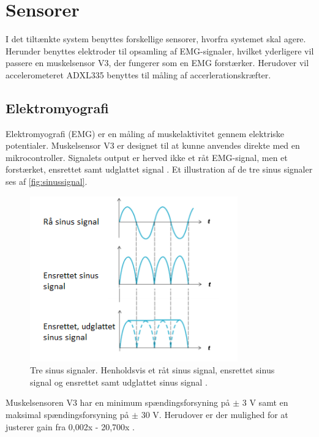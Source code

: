\section{Sensorer}
I det tiltænkte system benyttes forskellige sensorer, hvorfra systemet skal agere. Herunder benyttes elektroder til opsamling af EMG-signaler, hvilket yderligere vil passere en muskelsensor V3, der fungerer som en EMG forstærker. Herudover vil accelerometeret ADXL335 benyttes til måling af accerlerationskræfter.

\subsection{Elektromyografi}
Elektromyografi (EMG) er en måling af muskelaktivitet gennem elektriske potentialer. 
Muskelsensor V3 er designet til at kunne anvendes direkte med en mikrocontroller. Signalets output er herved ikke et råt EMG-signal, men et forstærket, ensrettet samt udglattet signal \citep{advancertech2013}. Et illustration af de tre sinus signaler ses af \autoref{fig:sinussignal}.

\begin{figure}[H]
\centering
\includegraphics[width=0.8\textwidth]{figures/sinussignal.png}
\caption{Tre sinus signaler. Henholdsvis et råt sinus signal, ensrettet sinus signal og ensrettet samt udglattet sinus signal \citep{advancertech2013}.}
\label{fig:sinussignal}
\end{figure}

Muskelsensoren V3 har en minimum spændingsforsyning på $\pm$ 3 V samt en maksimal spændingsforsyning på $\pm$ 30 V. Herudover er der mulighed for at justerer gain fra 0,002x - 20,700x \citep{advancertech2013}.




